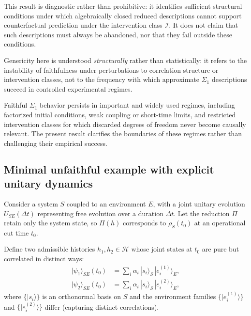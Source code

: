 \begin{remark}
This result is diagnostic rather than prohibitive: it identifies sufficient structural
conditions under which algebraically closed reduced descriptions cannot support
counterfactual prediction under the intervention class $\mathcal{I}$. It does not claim
that such descriptions must always be abandoned, nor that they fail outside these
conditions.
\end{remark}

\begin{remark}
Genericity here is understood \emph{structurally} rather than statistically:
it refers to the instability of faithfulness under perturbations to correlation
structure or intervention classes, not to the frequency with which approximate
$\Sigma_1$ descriptions succeed in controlled experimental regimes.
\end{remark}

\begin{remark}
Faithful $\Sigma_1$ behavior persists in important and widely used regimes, including
factorized initial conditions, weak coupling or short-time limits, and restricted
intervention classes for which discarded degrees of freedom never become causally
relevant. The present result clarifies the boundaries of these regimes rather than
challenging their empirical success.
\end{remark}

\subsection{Minimal unfaithful example with explicit unitary dynamics}

Consider a system $S$ coupled to an environment $E$, with a joint unitary evolution
$U_{SE}(\Delta t)$ representing free evolution over a duration $\Delta t$. Let the reduction
$\Pi$ retain only the system state, so $\Pi(h)$ corresponds to $\rho_S(t_0)$ at an operational
cut time $t_0$.

Define two admissible histories $h_1,h_2 \in \mathcal{H}$ whose joint states at $t_0$ are
pure but correlated in distinct ways:
\begin{align}
|\psi_1\rangle_{SE}(t_0) &= \sum_i \alpha_i \, |s_i\rangle_S \, |e_i^{(1)}\rangle_E, \\
|\psi_2\rangle_{SE}(t_0) &= \sum_i \alpha_i \, |s_i\rangle_S \, |e_i^{(2)}\rangle_E,
\end{align}
where $\{|s_i\rangle\}$ is an orthonormal basis on $S$ and the environment families
$\{|e_i^{(1)}\rangle\}$ and $\{|e_i^{(2)}\rangle\}$ differ (capturing distinct correlations).

